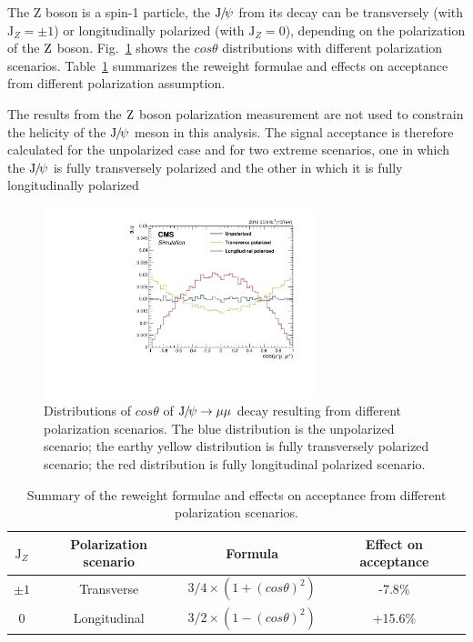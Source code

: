 		The Z boson is a spin-1 particle, the ${\mathrm{J}\hspace{-.08em}/\hspace{-.14em}\psi}$ from its decay can be transversely (with $\text{J}_{Z}=\pm 1$) or longitudinally polarized (with $\text{J}_{Z}=0$), depending on the polarization of the $\mathrm{Z}$ boson. 
		Fig.~\ref{fig:ZdecayJpsiPolarization} shows the $cos\theta$ distributions with different polarization scenarios. 
		Table~\ref{tab:PolSce} summarizes the reweight formulae and effects on acceptance from different polarization assumption.
		
	The results from the $\mathrm{Z}$ boson polarization measurement are not used to constrain the helicity of the ${\mathrm{J}\hspace{-.08em}/\hspace{-.14em}\psi}$ meson in this analysis. The signal acceptance is therefore calculated for the unpolarized case and for two extreme scenarios, one in which the ${\mathrm{J}\hspace{-.08em}/\hspace{-.14em}\psi}$ is fully transversely polarized and the other in which it is fully longitudinally polarized
		
		\begin{figure}[!ht]\begin{center}
		  \includegraphics[width=0.7\textwidth]{Fig/GenLevel_ZJpsiG/Polarization_Scenario}
		  \caption{Distributions of $cos\theta$ of ${\mathrm{J}\hspace{-.08em}/\hspace{-.14em}\psi}\to\mu\mu$ decay resulting from different polarization scenarios. The blue distribution is the unpolarized scenario; the earthy yellow distribution is fully transversely polarized scenario; the red distribution is fully longitudinal polarized scenario.}
		\label{fig:ZdecayJpsiPolarization}\end{center}\end{figure}
		
		\begin{table}[!ht]
		  \begin{center}
		    \begin{tabular}{|c|c|c|c|}
		    \hline
		      $\text{J}_{Z}$    & Polarization scenario   & Formula & Effect on acceptance \\ 
		      \hline
		      $\pm 1$   & Transverse   & $3/4\times(1+(cos\theta)^{2})$ & -7.8$\%$ \\
		      0   & Longitudinal   & $3/2\times(1-(cos\theta)^{2})$ & +15.6$\%$  \\
		      \hline
		    \end{tabular}
		    \caption{Summary of the reweight formulae and effects on acceptance from different polarization scenarios.\label{tab:PolSce}}
		  \end{center}
		\end{table}
		
